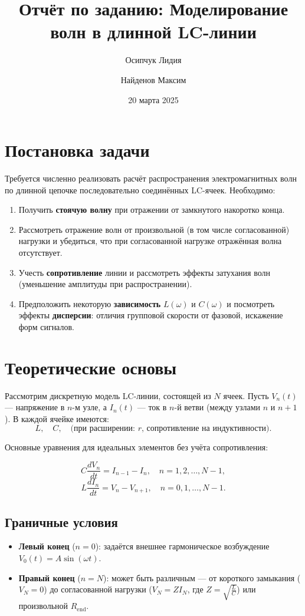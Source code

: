 \documentclass[12pt]{article}
\title{Отчёт по заданию: Моделирование волн в длинной LC-линии}
\author{Осипчук Лидия \and Найденов Максим}
\date{20 марта 2025}
\begin{document}
\maketitle

\section{Постановка задачи}

Требуется численно реализовать расчёт распространения электромагнитных волн
по длинной цепочке последовательно соединённых LC-ячеек. Необходимо:

\begin{enumerate}
  \item Получить \textbf{стоячую волну} при отражении от замкнутого накоротко конца.
  \item Рассмотреть отражение волн от произвольной (в том числе согласованной) нагрузки и убедиться,
    что при согласованной нагрузке отражённая волна отсутствует.
  \item Учесть \textbf{сопротивление} линии и рассмотреть эффекты затухания волн (уменьшение амплитуды при распространении).
  \item Предположить некоторую \textbf{зависимость} $L(\omega)$ и $C(\omega)$ и посмотреть эффекты \textbf{дисперсии}:
  отличия групповой скорости от фазовой, искажение форм сигналов.
\end{enumerate}

\section{Теоретические основы}

Рассмотрим дискретную модель LC-линии, состоящей из $N$ ячеек. Пусть $V_n(t)$ --- напряжение в $n$-м узле, а $I_n(t)$ --- ток в $n$-й ветви (между узлами $n$ и $n+1$). В каждой ячейке имеются:
\[
  L, \quad C, \quad \text{(при расширении: } r \text{, сопротивление на индуктивности).}
\]

Основные уравнения для идеальных элементов без учёта сопротивления:

\[
  C \frac{d V_n}{dt} = I_{n-1} - I_n, \quad n = 1,2,\ldots,N-1,
\]
\[
  L \frac{d I_n}{dt} = V_n - V_{n+1}, \quad n = 0,1,\ldots,N-1.
\]

\subsection{Граничные условия}

\begin{itemize}
  \item \textbf{Левый конец} ($n=0$): задаётся внешнее гармоническое возбуждение $V_0(t) = A \sin(\omega t)$.
  \item \textbf{Правый конец} ($n=N$): может быть различным ---
  от короткого замыкания ($V_N=0$) до согласованной нагрузки ($V_N = Z I_N$, где
  $Z = \sqrt{\frac{L}{C}}$) или произвольной $R_{\mathrm{end}}$.
\end{itemize}
\end{document}
